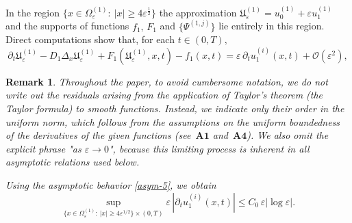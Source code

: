 \documentclass[reqno]{amsart}            %
\newtheorem{remark}{Remark}[section]
\numberwithin{equation}{section}
\begin{document}
	In the region $\{x\in \Omega_\varepsilon^{(1)} \colon \ |x| \ge 4 \varepsilon^{\frac12}\}$ the approximation $\mathfrak{U}_\varepsilon^{(1)} = u_0^{(1)} + \varepsilon u_1^{(1)}$ and 
	the supports of functions $f_1, \, F_1$ and $\{\Psi^{(1,j)}\}$ lie entirely in this region. 
	Direct computations show that, for each $t\in (0,T),$
	\begin{equation}\label{res-reg-0}
		\partial_t \mathfrak{U}_\varepsilon^{(1)} - D_1 \Delta_x \mathfrak{U}_\varepsilon^{(1)} + F_1(\mathfrak{U}_\varepsilon^{(1)},x,t) - f_1(x,t) = \varepsilon \, \partial_t u_1^{(i)}(x,t) + \mathcal{O}(\varepsilon^2),
	\end{equation}
	\begin{remark}\label{rem-3-1}
		Throughout the paper, to avoid cumbersome notation, we do not write out the residuals arising from the application of Taylor's theorem (the Taylor formula) to smooth functions.  
		Instead, we indicate only their order in the uniform norm, which follows from the assumptions on the uniform boundedness of the derivatives of the given functions (see~$\mathbf{A1}$ and~$\mathbf{A4}$). We also omit the explicit phrase "as $\varepsilon \to 0$",
		because this limiting process is inherent in all asymptotic relations used below.
		
		Using the asymptotic behavior \eqref{asym-5}, we obtain
		\begin{equation}
			\sup_{\{x\in \Omega_\varepsilon^{(1)} : \ |x| \ge 4 \varepsilon^{1/2}\}\times(0,T)}
			\varepsilon\, |\partial_t u_1^{(i)}(x,t)|
			\le C_0\, \varepsilon |\log\varepsilon|.
		\end{equation}
	\end{remark}
	
\end{document}
